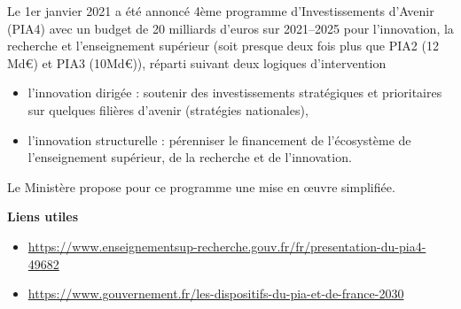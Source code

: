 Le 1er janvier 2021 a \'et\'e annonc\'e 4\`eme programme d'Investissements d'Avenir (PIA4) avec un budget de 20 milliards d'euros sur 2021--2025 pour l'innovation, la recherche et l'enseignement sup\'erieur (soit presque deux fois plus que PIA2 (12 Md\euro) et PIA3 (10Md\euro)), r\'eparti suivant deux logiques d'intervention
\begin{itemize}
\item l'innovation dirig\'ee : soutenir des investissements strat\'egiques et prioritaires sur quelques fili\`eres d'avenir (strat\'egies nationales),
\item l'innovation structurelle : p\'erenniser le financement de l'\'ecosyst\`eme de l'enseignement sup\'erieur, de la recherche et de l'innovation.
\end{itemize}
Le Minist\`ere propose pour ce programme une mise en {\oe}uvre simplifi\'ee.

\textbf{Liens utiles\hspace{.5em}}
\begin{itemize}
\item \url{https://www.enseignementsup-recherche.gouv.fr/fr/presentation-du-pia4-49682}
\item \url{https://www.gouvernement.fr/les-dispositifs-du-pia-et-de-france-2030}
\end{itemize}

%
%
%

